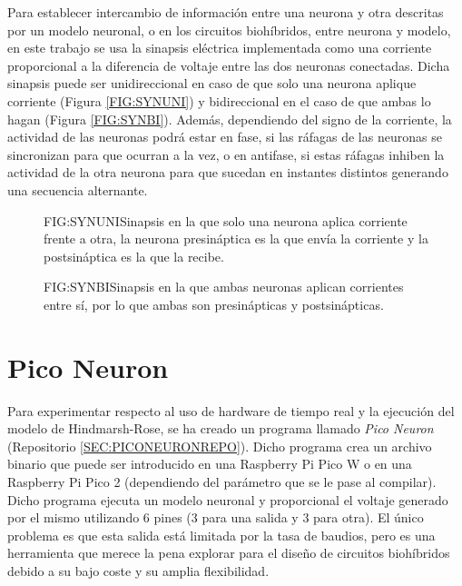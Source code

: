 Para establecer intercambio de información entre una neurona y otra descritas por un modelo neuronal, o en los circuitos biohíbridos, entre neurona y modelo, en este trabajo se usa la sinapsis eléctrica implementada como una corriente proporcional a la diferencia de voltaje entre las dos neuronas conectadas\cite{Reyes-Sanchez2020}. Dicha sinapsis puede ser unidireccional en caso de que solo una neurona aplique corriente (Figura \ref{FIG:SYNUNI}) y bidireccional en el caso de que ambas lo hagan (Figura \ref{FIG:SYNBI}). Además, dependiendo del signo de la corriente,  la actividad de las neuronas podrá estar en fase, si las ráfagas de las neuronas se sincronizan para que ocurran a la vez, o en antifase, si estas ráfagas inhiben la actividad de la otra neurona para que sucedan en instantes distintos generando una secuencia alternante.

\begin{figure}[Esquema de sinapsis unidireccional]{FIG:SYNUNI}{Sinapsis en la que solo una neurona aplica corriente frente a otra, la neurona presináptica es la que envía la corriente y la postsináptica es la que la recibe.}
\end{figure}

\begin{figure}[Esquema de sinapsis bidireccional]{FIG:SYNBI}{Sinapsis en la que ambas neuronas aplican corrientes entre sí, por lo que ambas son presinápticas y postsinápticas.}
\end{figure}

\section{Pico Neuron\label{SEC:PICONEURON}}


Para experimentar respecto al uso de hardware de tiempo real y la ejecución del modelo de Hindmarsh-Rose, se ha creado un programa llamado \textit{Pico Neuron} (Repositorio \ref{SEC:PICONEURONREPO}). Dicho programa crea un archivo binario que puede ser introducido en una Raspberry Pi Pico W o en una Raspberry Pi Pico 2 (dependiendo del parámetro que se le pase al compilar). Dicho programa ejecuta un modelo neuronal y proporcional el voltaje generado por el mismo utilizando 6 pines (3 para una salida y 3 para otra). El único problema es que esta salida está limitada por la tasa de baudios, pero es una herramienta que merece la pena explorar para el diseño de circuitos biohíbridos debido a su bajo coste y su amplia flexibilidad.


